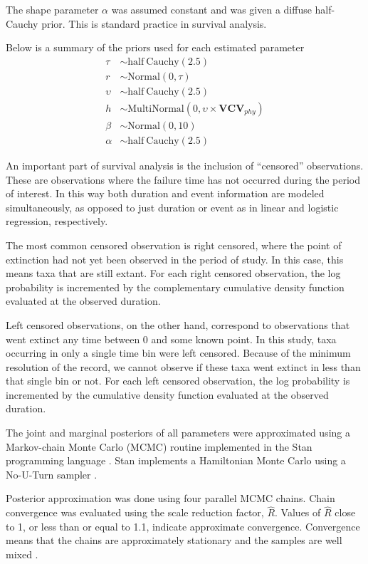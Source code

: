 \documentclass[12pt,letterpaper]{article}
\begin{document}
The shape parameter \(\alpha\) was assumed constant and was given a diffuse half-Cauchy prior. This is standard practice in survival analysis.

Below is a summary of the priors used for each estimated parameter 
\begin{align*}
  \tau &\sim \mathrm{half\ Cauchy}(2.5) \\
  r &\sim \mathrm{Normal}(0, \tau) \\
  \upsilon &\sim \mathrm{half\ Cauchy}(2.5) \\
  h &\sim \mathrm{MultiNormal}(0, \upsilon \times \mathbf{VCV}_{phy}) \\
  \beta &\sim \mathrm{Normal}(0, 10) \\
  \alpha &\sim \mathrm{half\ Cauchy}(2.5)
\end{align*}


An important part of survival analysis is the inclusion of ``censored'' observations. These are observations where the failure time has not occurred during the period of interest. In this way both duration and event information are modeled simultaneously, as opposed to just duration or event as in linear and logistic regression, respectively. 

The most common censored observation is right censored, where the point of extinction had not yet been observed in the period of study. In this case, this means taxa that are still extant. For each right censored observation, the log probability is incremented by the complementary cumulative density function evaluated at the observed duration.

Left censored observations, on the other hand, correspond to observations that went extinct any time between 0 and some known point. In this study, taxa occurring in only a single time bin were left censored. Because of the minimum resolution of the record, we cannot observe if these taxa went extinct in less than that single bin or not. For each left censored observation, the log probability is incremented by the cumulative density function evaluated at the observed duration.

The joint and marginal posteriors of all parameters were approximated using a Markov-chain Monte Carlo (MCMC) routine implemented in the Stan programming language \citep{2014stan}. Stan implements a Hamiltonian Monte Carlo using a No-U-Turn sampler \citep{Hoffman-Gelman:2011}. 

Posterior approximation was done using four parallel MCMC chains. Chain convergence was evaluated using the scale reduction factor, \(\hat{R}\). Values of \(\hat{R}\) close to 1, or less than or equal to 1.1, indicate approximate convergence. Convergence means that the chains are approximately stationary and the samples are well mixed \citep{Gelman2013d}.
\end{document}
